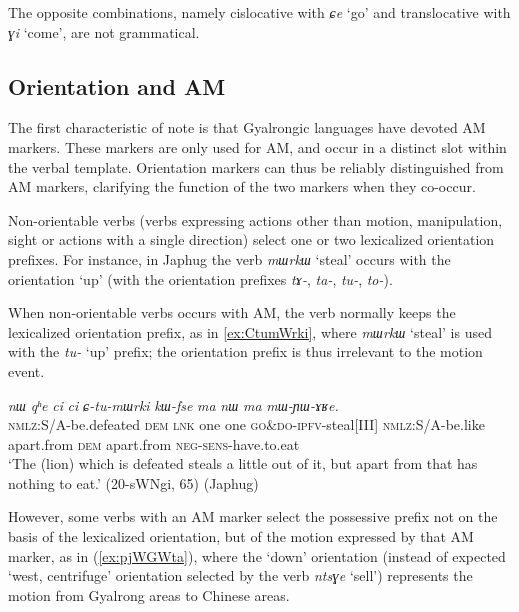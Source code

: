 \documentclass[oneside,a4paper,11pt]{article}
\newcommand{\ipa}[1]{{\phon\textit{#1}}}
\newcommand{\forme}[1]{\textit{\phon#1}}
\newcommand{\japhug}[2]{\textit{\phon#1} `#2'}
\newcommand{\rouge}[1]{{\color{red}#1}}
\begin{document}
The opposite combinations, namely cislocative with \japhug{ɕe}{go} and translocative with \japhug{ɣi}{come}, are not grammatical. 



\subsection{Orientation and AM} \label{sec:orientation.japhug}
The first characteristic of note is that Gyalrongic languages have devoted AM markers.  These markers are only used for AM, and occur in a distinct slot within the verbal template.  Orientation markers can thus be reliably distinguished from AM markers, clarifying the function of the two markers when they co-occur.


Non-orientable verbs (verbs expressing actions other than motion, manipulation, sight or actions with a single direction) select one or two lexicalized orientation prefixes. For instance, in Japhug the verb \japhug{mɯrkɯ}{steal} occurs with the orientation `up' (with the orientation prefixes \forme{tɤ-}, \forme{ta-}, \forme{tu-}, \forme{to-}). 

When non-orientable verbs occurs with AM, the verb normally keeps the lexicalized orientation prefix, as in \ref{ex:CtumWrki}, where \japhug{mɯrkɯ}{steal} is used with the \forme{tu-} `up' prefix; the orientation prefix is thus irrelevant to the motion event. 

\begin{exe}
\ex \label{ex:CtumWrki}
 \gll \ipa{kɯ-nŋo}	\ipa{nɯ}	\ipa{qʰe}	\ipa{ci}	\ipa{ci}	\ipa{\rouge{ɕ}-tu-mɯrki}	\ipa{kɯ-fse}	\ipa{ma}	\ipa{nɯ}	\ipa{ma}	\ipa{mɯ-ɲɯ-ɤʁe.} \\
\textsc{nmlz}:S/A-be.defeated \textsc{dem} \textsc{lnk} one one \rouge{\textsc{go\&do}}-\textsc{ipfv}-steal[III] \textsc{nmlz}:S/A-be.like apart.from \textsc{dem} apart.from \textsc{neg}-\textsc{sens}-have.to.eat \\
\glt `The (lion) which is defeated steals a little out of it, but apart from that has nothing to eat.' (20-sWNgi, 65) (Japhug)
\end{exe}

However, some verbs with an AM marker select the possessive prefix not on the basis of the lexicalized orientation, but of the motion expressed by that AM marker, as in (\ref{ex:pjWGWta}), where the `down' orientation (instead of expected `west, centrifuge' orientation selected by the verb \forme{ntsɣe} `sell') represents the motion from Gyalrong areas to Chinese areas.
\end{document}
